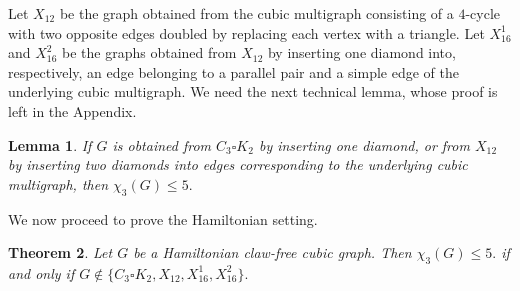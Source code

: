 \documentclass[10pt,a4paper]{article}
\newtheorem{theorem}             {Theorem}
\newtheorem{lemma}     	[theorem] {Lemma}
\theoremstyle{case}
\numberwithin{subcase}{case}
\begin{document}
Let $X_{12}$ be the graph obtained from the cubic multigraph consisting
of a $4$-cycle with two opposite edges doubled by replacing each
vertex with a triangle. Let $X_{16}^1$ and $X_{16}^2$ be the graphs
obtained from $X_{12}$ by inserting one diamond into, respectively,
an edge belonging to a parallel pair and a simple edge of the
underlying cubic multigraph.
We need the next technical lemma, whose proof is left in the Appendix.

\begin{lemma}\label{lem:small-diamond-insertions}
If $G$ is obtained from $C_3\square K_2$ by inserting one diamond, or
from $X_{12}$ by inserting two diamonds into edges corresponding to the
underlying cubic multigraph, then
$
\chi_3(G)\leq5.
$
\end{lemma}

We now proceed to prove the Hamiltonian setting.


\begin{theorem}\label{thm:ham-clawfree}
Let $G$ be a Hamiltonian claw-free cubic graph. 
Then
$
\chi_3(G)\leq5.
$
if and only if
$
G\notin\{C_3\square K_2,X_{12},X_{16}^{1},X_{16}^{2}\}.
$
\end{theorem}
\end{document}
